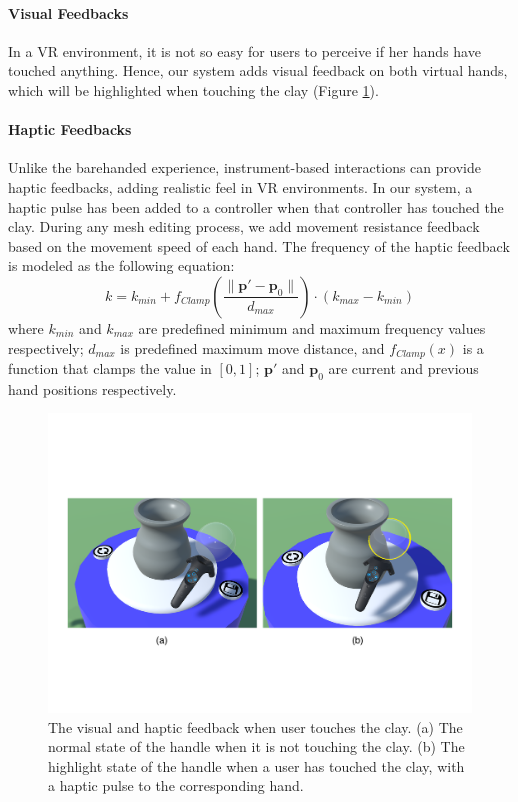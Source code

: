 \documentclass{svjour3}                     %
\begin{document}
\paragraph{Visual Feedbacks}
In a VR environment, it is not so easy for users to perceive if her hands have touched anything. Hence, our system adds visual feedback on both virtual hands, which will be highlighted when touching the clay (Figure \ref{fig:highlight}).

\paragraph{Haptic Feedbacks}
Unlike the barehanded experience, instrument-based interactions can provide haptic feedbacks, adding realistic feel in VR environments. In our system, a haptic pulse has been added to a controller when that controller has touched the clay. During any mesh editing process, we add movement resistance feedback based on the movement speed of each hand. The frequency of the haptic feedback is modeled as the following equation:
\begin{equation}
k = k_{min} + f_{Clamp}(\frac{ \| \mathbf{p'} - \mathbf{p}_{0} \|}{d_{max}}) \cdot (k_{max} - k_{min})
\end{equation}
where $k_{min}$ and $k_{max}$ are predefined minimum and maximum frequency values respectively; $d_{max}$ is predefined maximum move distance, and $f_{Clamp}(x)$ is a function that clamps the value in $[0,1]$; $\mathbf{p'}$ and $\mathbf{p}_{0}$ are current and previous hand positions respectively.

\begin{figure}
\includegraphics[width=\textwidth]{fig10}
\caption{The visual and haptic feedback when user touches the clay. (a) The normal state of the handle when it is not touching the clay. (b) The highlight state of the handle when a user has touched the clay, with a haptic pulse to the corresponding hand.}
\label{fig:highlight}
\end{figure}
\end{document}
